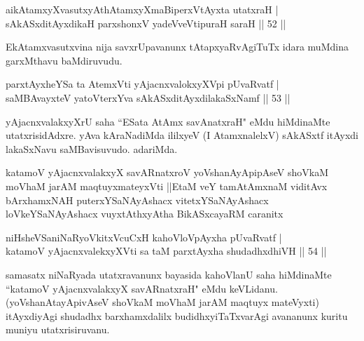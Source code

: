 \begin{shl}
aikAtamxyXvasutxyAthAtamxyXmaBiperxVtAyxta utatxraH |\\
sAkASxditAyxdikaH parxshonxV yadeVveVtipuraH saraH \hfill || 52 ||
\end{shl}

\begin{artha}
EkAtamxvasutxvina nija savxrUpavanunx tAtapxyaRvAgiTuTx idara muMdina garxMthavu baMdiruvudu. 
\end{artha}


\begin{shl}
parxtAyxheYSa ta AtemxVti yAjacnxvalokxyXV\s pi pUvaRvatf |\\
saMBAvayxteV yatoV\s terxYva sAkASxditAyxdilakaSxNamf \hfill || 53 ||
\end{shl}

\begin{artha}
yAjacnxvalakxyXrU saha ``ESata AtAmx savAnatxraH" eMdu hiMdinaMte utatxrisidAdxre. yAva kAraNadiMda ililxyeV (I AtamxnalelxV) sAkASxtf itAyxdi lakaSxNavu saMBavisuvudo. adariMda.
\end{artha}

\begin{shl}
katamoV yAjacnxvalakxyX savARnatxroV yoV\s shanAyApipAseV shoVkaM moVhaM jarAM maqtuyxmateyxVti ||EtaM veY tamAtAmxnaM viditAvx bArxhamxNAH puterxYSaNAyAshacx vitetxYSaNAyAshacx loVkeYSaNAyAshacx vuyxtAthxyAtha BikASxcayaRM caranitx
\end{shl}

\begin{shl}
niHsheVSaniNaRyoVkitxVcuCxH kahoVloV\s pAyxha pUvaRvatf |\\
katamoV yAjacnxvalekxyXVti sa taM parxtAyxha shudadhxdhiVH \hfill || 54 ||
\end{shl}

\begin{artha}%
samasatx niNaRyada utatxravanunx bayasida kahoVlanU saha hiMdinaMte  ``katamoV yAjacnxvalakxyX savARnatxraH" eMdu keVLidanu. (yoV\s shanAtayApivAseV shoVkaM moVhaM jarAM maqtuyx mateVyxti) itAyxdiyAgi shudadhx barxhamxdalilx budidhxyiTaTxvarAgi avananunx kuritu muniyu utatxrisiruvanu.
\end{artha}


